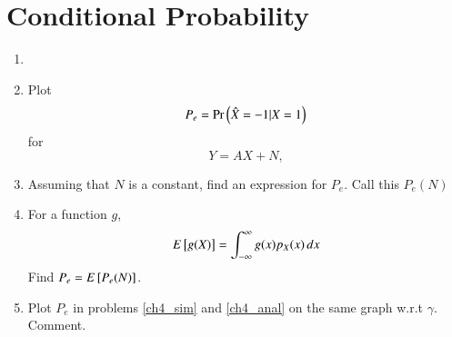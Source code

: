 \documentclass[journal,12pt,twocolumn]{IEEEtran}
\renewcommand\thesection{\arabic{section}}
\begin{document}
\section{Conditional Probability}
\begin{enumerate}[label=\thesection.\arabic*
,ref=\thesection.\theenumi]
\item
\item
\label{ch4_sim}
Plot 
\begin{equation}
P_e = \Pr\left(\hat{X} = -1|X=1\right)
\end{equation}
%
for 
\begin{equation}
Y = AX+N,
\end{equation}

%
\item
Assuming that $N$ is a constant, find an expression for $P_e$.  Call this $P_e(N)$

%
\item
%
\label{ch4_anal}
For a function $g$,
\begin{equation}
E{}\left[g(X)\right] = \int_{-\infty}^{\infty}g(x)p_{X}(x)\, dx
\end{equation}
%
Find $P_e = E{}\left[P_e(N)\right]$.

%
\item
Plot $P_e$ in problems \ref{ch4_sim} and \ref{ch4_anal} on the same graph w.r.t $\gamma$.  Comment.

		\end{enumerate}
\end{document}
